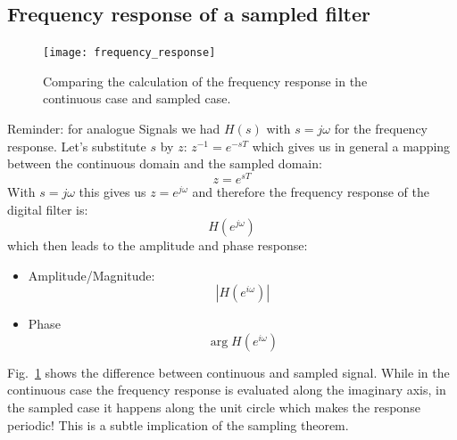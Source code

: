 \documentclass[12pt,a4paper]{article}
\begin{document}
\subsection{Frequency response of a sampled filter}
\begin{figure}[!hbt]
\begin{center}
\mbox{\texttt{[image: frequency\_response]}}
\end{center}
\caption{Comparing the calculation of the frequency response
in the continuous case and sampled case.
\label{frequency_response}}
\end{figure}
Reminder: for analogue Signals we had $H(s)$ with $s=j \omega$ for the
frequency response. Let's substitute $s$ by $z$: $z^{-1} = e^{-sT}$
which gives us in general a mapping between the continuous domain and
the sampled domain:
\begin{equation}
z = e^{sT}
\label{mappingsz}
\end{equation}
With $s=j \omega$ this gives us $z = e^{j \omega}$ and therefore
the frequency response of the digital filter is:
\begin{equation}
H(e^{j \omega})
\end{equation}
which then leads to the amplitude and phase response:
\begin{itemize}
\item Amplitude/Magnitude: 
\begin{equation}
|H(e^{i \omega})|
\end{equation}
\item Phase
\begin{equation}
\arg H(e^{i \omega})
\end{equation}
\end{itemize}
Fig.~\ref{frequency_response} shows the difference between
continuous and sampled signal. While in the continuous case
the frequency response
is evaluated along the imaginary axis, in the sampled case
it happens along the unit circle which makes the response
periodic! This is a subtle implication of the sampling theorem.

\clearpage
\end{document}
